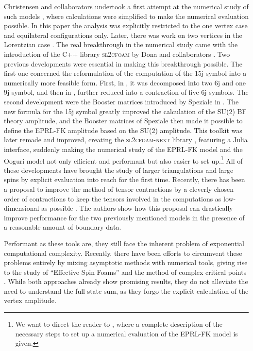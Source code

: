 Christensen and collaborators undertook a first attempt at the numerical study
of such models \cite{christensenNumericalEvidenceRegularized2009}, where
calculations were simplified to make the numerical evaluation possible. In this
paper the analysis was explicitly restricted to the one vertex case and
equilateral configurations only. Later, there was work on two vertices in the
Lorentzian case \cite{sarno2vertexLorentzianSpin2018}. The real breakthrough in
the numerical study came with the introduction of the \textsc{C++} library
\textsc{sl2cfoam} by Dona and collaborators
\cite{donaNumericalMethodsEPRL2018,donaNumericalStudyLorentzian2019,donaSearchingClassicalGeometries2020}.
Two previous developments were essential in making this breakthrough possible.
The first one concerned the reformulation of the computation of the 15j symbol
into a numerically more feasible form. First, in
\cite{donaSU2GraphInvariants2018}, it was decomposed into two 6j and one 9j
symbol, and then in \cite{donaNumericalMethodsEPRL2018}, further reduced into a
contraction of five 6j symbols. The second development were the Booster
matrices introduced by Speziale in \cite{spezialeBoostingWignersNjsymbols2017}.
The new formula for the 15j symbol greatly improved the calculation of the
SU(2) BF theory amplitude, and the Booster matrices of Speziale then made it
possible to define the EPRL-FK amplitude based on the SU(2) amplitude. This
toolkit was later remade and improved, creating the \textsc{sl2cfoam-next}
library \cite{donaSpinfoamsHighPerformanceComputing2023}, featuring a Julia interface,
suddenly making the numerical study of the EPRL-FK model and the Ooguri model
not only efficient and performant but also easier to set up.\footnote{We want
to direct the reader to \cite{donaHowToComputeEPRL2022}, where a complete
description of the necessary steps to set up a numerical evaluation of the
EPRL-FK model is given.} All of these developments have brought the study of
larger triangulations and large spins by explicit evaluation into reach for the
first time. Recently, there has been a proposal to improve the method of tensor
contractions by a cleverly chosen order of contractions to keep the tensors
involved in the computations as low-dimensional as possible
\cite{asanteEfficientTensorNetwork2024}. The authors show how this proposal can
drastically improve performance for the two previously mentioned models in the
presence of a reasonable amount of boundary data. 

Performant as these tools are, they still face the inherent problem of
exponential computational complexity. Recently, there have been efforts to
circumvent these problems entirely by mixing asymptotic methods with numerical
tools, giving rise to the study of ``Effective Spin Foams''
\cite{asanteEffectiveSpinFoam2020,asanteEffectiveSpinFoam2021,asanteDiscreteGravityDynamics2021}
and the method of complex critical points
\cite{hanAnalyticContinuationSpin2022,hanComplexCriticalPoints2022,hanComplexCriticalPoints2023}.
While both approaches already show promising results, they do not alleviate the
need to understand the full state sum, as they forgo the explicit calculation
of the vertex amplitude.

